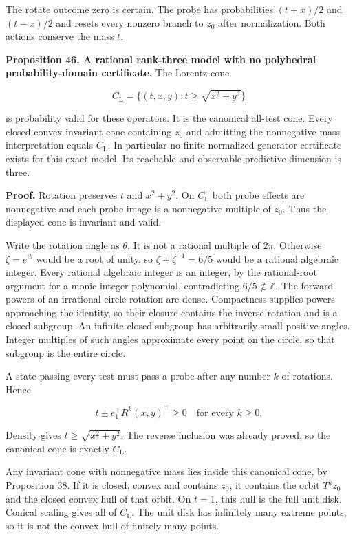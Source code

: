 The rotate outcome zero is certain. The probe has probabilities
\((t+x)/2\) and \((t-x)/2\) and resets every nonzero branch to \(z_0\)
after normalization. Both actions conserve the mass \(t\).

\textbf{Proposition 46. A rational rank-three model with no polyhedral
probability-domain certificate.} The Lorentz cone

\[
C_{\mathrm L}=\{(t,x,y):t\geq\sqrt{x^2+y^2}\}
\]

is probability valid for these operators. It is the canonical all-test
cone. Every closed convex invariant cone containing \(z_0\) and
admitting the nonnegative mass interpretation equals \(C_{\mathrm L}\).
In particular no finite normalized generator certificate exists for this
exact model. Its reachable and observable predictive dimension is three.

\textbf{Proof.} Rotation preserves \(t\) and \(x^2+y^2\). On
\(C_{\mathrm L}\) both probe effects are nonnegative and each probe
image is a nonnegative multiple of \(z_0\). Thus the displayed cone is
invariant and valid.

Write the rotation angle as \(\theta\). It is not a rational multiple of
\(2\pi\). Otherwise \(\zeta=e^{i\theta}\) would be a root of unity, so
\(\zeta+\zeta^{-1}=6/5\) would be a rational algebraic integer. Every
rational algebraic integer is an integer, by the rational-root argument
for a monic integer polynomial, contradicting \(6/5\notin\mathbb Z\).
The forward powers of an irrational circle rotation are dense.
Compactness supplies powers approaching the identity, so their closure
contains the inverse rotation and is a closed subgroup. An infinite
closed subgroup has arbitrarily small positive angles. Integer multiples
of such angles approximate every point on the circle, so that subgroup
is the entire circle.

A state passing every test must pass a probe after any number \(k\) of
rotations. Hence

\[
t\pm e_1^\top R^k(x,y)^\top\geq0
\quad\text{for every }k\geq0.
\]

Density gives \(t\geq\sqrt{x^2+y^2}\). The reverse inclusion was already
proved, so the canonical cone is exactly \(C_{\mathrm L}\).

Any invariant cone with nonnegative mass lies inside this canonical
cone, by Proposition 38. If it is closed, convex and contains \(z_0\),
it contains the orbit \(T^kz_0\) and the closed convex hull of that
orbit. On \(t=1\), this hull is the full unit disk. Conical scaling
gives all of \(C_{\mathrm L}\). The unit disk has infinitely many
extreme points, so it is not the convex hull of finitely many points.

